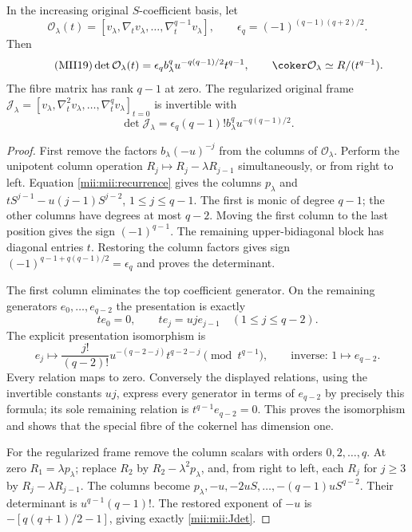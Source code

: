 \begin{theorem}
In the increasing original $S$-coefficient basis, let
\[
 \mathcal O_\lambda(t)=[v_\lambda,\nabla_t v_\lambda,
                  \ldots,\nabla_t^{q-1}v_\lambda],
 \qquad\epsilon_q=(-1)^{(q-1)(q+2)/2}.
\]
Then
\begin{equation}\tag{MII19}\label{mii:mii:Odet}
 \det\mathcal O_\lambda(t)
   =\epsilon_q b_\lambda^q u^{-q(q-1)/2}t^{q-1},
 \qquad\coker\mathcal O_\lambda\simeq R/(t^{q-1}).
\end{equation}
The fibre matrix has rank $q-1$ at zero. The regularized original
frame
$\mathcal J_\lambda=[v_\lambda,\nabla_t^2v_\lambda,
\ldots,\nabla_t^qv_\lambda]_{t=0}$ is invertible with
\begin{equation}\tag{MII20}\label{mii:mii:Jdet}
 \det\mathcal J_\lambda
    =\epsilon_q(q-1)!b_\lambda^q u^{-q(q-1)/2}.
\end{equation}
\end{theorem}
\begin{proof}
First remove the factors $b_\lambda(-u)^{-j}$ from the columns
of $\mathcal O_\lambda$. Perform the unipotent column operation
$R_j\mapsto R_j-\lambda R_{j-1}$ simultaneously, or from right
to left. Equation \eqref{mii:mii:recurrence} gives the columns
$p_\lambda$ and $tS^{j-1}-u(j-1)S^{j-2}$, $1\le j\le q-1$.
The first is monic of degree $q-1$; the other columns have degrees
at most $q-2$. Moving the first column to the last position gives
the sign $(-1)^{q-1}$. The remaining upper-bidiagonal block has
diagonal entries $t$. Restoring the column factors gives sign
$(-1)^{q-1+q(q-1)/2}=\epsilon_q$ and proves the determinant.

The first column eliminates the top coefficient generator. On the
remaining generators $e_0,\ldots,e_{q-2}$ the presentation is exactly
\[
 te_0=0,\qquad te_j=u j e_{j-1}\quad(1\le j\le q-2).
\]
The explicit presentation isomorphism is
\begin{equation}\tag{MII21}\label{mii:mii:cokeriso}
 e_j\longmapsto
 \frac{j!}{(q-2)!}u^{-(q-2-j)}t^{q-2-j}\pmod{t^{q-1}},
 \qquad\text{inverse: }1\longmapsto e_{q-2}.
\end{equation}
Every relation maps to zero. Conversely the displayed relations,
using the invertible constants $uj$, express every generator in
terms of $e_{q-2}$ by precisely this formula; its sole remaining
relation is $t^{q-1}e_{q-2}=0$. This proves the isomorphism and
shows that the special fibre of the cokernel has dimension one.

For the regularized frame remove the column scalars with orders
$0,2,\ldots,q$. At zero $R_1=\lambda p_\lambda$; replace
$R_2$ by $R_2-\lambda^2p_\lambda$, and, from right to left, each
$R_j$ for $j\ge3$ by $R_j-\lambda R_{j-1}$. The columns become
$p_\lambda,-u,-2uS,\ldots,-(q-1)uS^{q-2}$. Their determinant
is $u^{q-1}(q-1)!$. The restored exponent of $-u$ is
$-[q(q+1)/2-1]$, giving exactly \eqref{mii:mii:Jdet}.
\end{proof}


